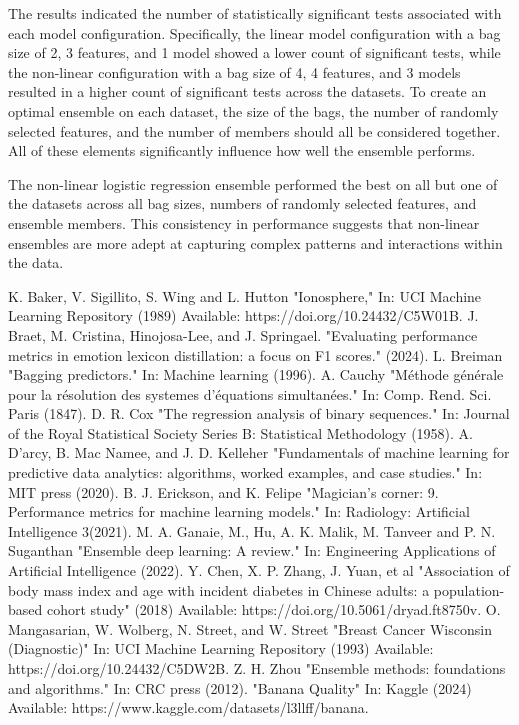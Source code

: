 \documentclass[10pt, conference]{IEEEtran}
\begin{document}
The results indicated the number of statistically significant tests associated with each model configuration.
Specifically, the linear model configuration with a bag size of 2, 3 features, and 1 model showed a lower
count of significant tests, while the non-linear configuration with a bag size of 4, 4 features, and 3
models resulted in a higher count of significant tests across the datasets. To create an optimal ensemble on each
dataset, the size of the bags, the number of randomly selected features, and the number of members should all
be considered together. All of these elements significantly influence how well the ensemble performs.

The non-linear logistic regression ensemble performed the best on all but one of the datasets across all
bag sizes, numbers of randomly selected features, and ensemble members. This consistency in performance
suggests that non-linear ensembles are more adept at capturing complex patterns and interactions within
the data.

\begin{thebibliography}{00}
     K. Baker, V. Sigillito, S. Wing and L. Hutton "Ionosphere," In: UCI Machine Learning Repository (1989) Available: https://doi.org/10.24432/C5W01B.
     J. Braet, M. Cristina, Hinojosa-Lee, and J. Springael. "Evaluating performance metrics in emotion lexicon distillation: a focus on F1 scores." (2024).
     L. Breiman "Bagging predictors." In: Machine learning (1996).
     A. Cauchy "Méthode générale pour la résolution des systemes d’équations simultanées." In: Comp. Rend. Sci. Paris (1847).
     D. R. Cox "The regression analysis of binary sequences." In: Journal of the Royal Statistical Society Series B: Statistical Methodology (1958).
     A. D'arcy, B. Mac Namee, and J. D. Kelleher "Fundamentals of machine learning for predictive data analytics: algorithms, worked examples, and case studies." In: MIT press (2020).
     B. J. Erickson, and K. Felipe "Magician’s corner: 9. Performance metrics for machine learning models." In: Radiology: Artificial Intelligence 3(2021).
     M. A. Ganaie, M., Hu, A. K. Malik, M. Tanveer and P. N. Suganthan "Ensemble deep learning: A review." In: Engineering Applications of Artificial Intelligence (2022).
     Y. Chen, X. P. Zhang, J. Yuan, et al "Association of body mass index and age with incident diabetes in Chinese adults: a population-based cohort study" (2018) Available: https://doi.org/10.5061/dryad.ft8750v.
     O. Mangasarian, W. Wolberg, N. Street, and W. Street "Breast Cancer Wisconsin (Diagnostic)" In: UCI Machine Learning Repository (1993) Available: https://doi.org/10.24432/C5DW2B.
     Z. H. Zhou "Ensemble methods: foundations and algorithms." In: CRC press (2012).
     "Banana Quality" In: Kaggle (2024) Available: https://www.kaggle.com/datasets/l3llff/banana.
\end{thebibliography}

\printglossary[type=\acronymtype]
\end{document}
